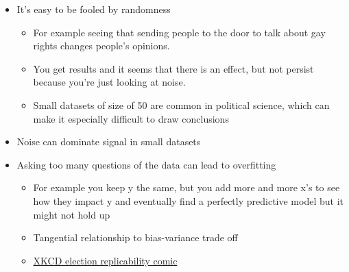 \begin{itemize}
    \item It’s easy to be fooled by randomness
    
    \begin{itemize}
        \item For example seeing that sending people to the door to talk about gay rights changes people’s opinions. 
        \item You get results and it seems that there is an effect, but not persist because you’re just looking at noise. 
        \item Small datasets of size of 50 are common in political science, which can make it especially difficult to draw conclusions
    \end{itemize}

    \item Noise can dominate signal in small datasets
    
    \item Asking too many questions of the data can lead to overfitting
    
    \begin{itemize}
        \item For example you keep y the same, but you add more and more x’s to see how they impact y and eventually find a perfectly predictive model but it might not hold up 
        \item Tangential relationship to bias-variance trade off
        \item \href{https://xkcd.com/1122/}{XKCD election replicability comic}
    \end{itemize}
\end{itemize}
